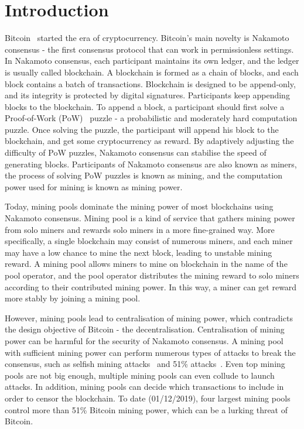 \section{Introduction}
\label{sec:intro}

Bitcoin~\cite{} started the era of cryptocurrency.
Bitcoin's main novelty is Nakamoto consensus - the first consensus protocol that can work in permissionless settings.
In Nakamoto consensus, each participant maintains its own ledger, and the ledger is usually called blockchain.
A blockchain is formed as a chain of blocks, and each block contains a batch of transactions.
Blockchain is designed to be append-only, and its integrity is protected by digital signatures.
Participants keep appending blocks to the blockchain.
To append a block, a participant should first solve a Proof-of-Work (PoW)~\cite{} puzzle - a probabilistic and moderately hard computation puzzle.
Once solving the puzzle, the participant will append his block to the blockchain, and get some cryptocurrency as reward.
By adaptively adjusting the difficulty of PoW puzzles, Nakamoto consensus can stabilise the speed of generating blocks.
Participants of Nakamoto consensus are also known as miners, the process of solving PoW puzzles is known as mining, and the computation power used for mining is known as mining power.

Today, mining pools dominate the mining power of most blockchains using Nakamoto consensus.
Mining pool is a kind of service that gathers mining power from solo miners and rewards solo miners in a more fine-grained way.
More specifically, a single blockchain may consist of numerous miners, and each miner may have a low chance to mine the next block, leading to unstable mining reward.
A mining pool allows miners to mine on blockchain in the name of the pool operator, and the pool operator distributes the mining reward to solo miners according to their contributed mining power.
In this way, a miner can get reward more stably by joining a mining pool.

However, mining pools lead to centralisation of mining power, which contradicts the design objective of Bitcoin - the decentralisation.
Centralisation of mining power can be harmful for the security of Nakamoto consensus.
A mining pool with sufficient mining power can perform numerous types of attacks to break the consensus, such as selfish mining attacks~\cite{} and 51\% attacks~\cite{}.
Even top mining pools are not big enough, multiple mining pools can even collude to launch attacks.
In addition, mining pools can decide which transactions to include in order to censor the blockchain.
To date (01/12/2019), four largest mining pools control more than 51\% Bitcoin mining power, which can be a lurking threat of Bitcoin.




